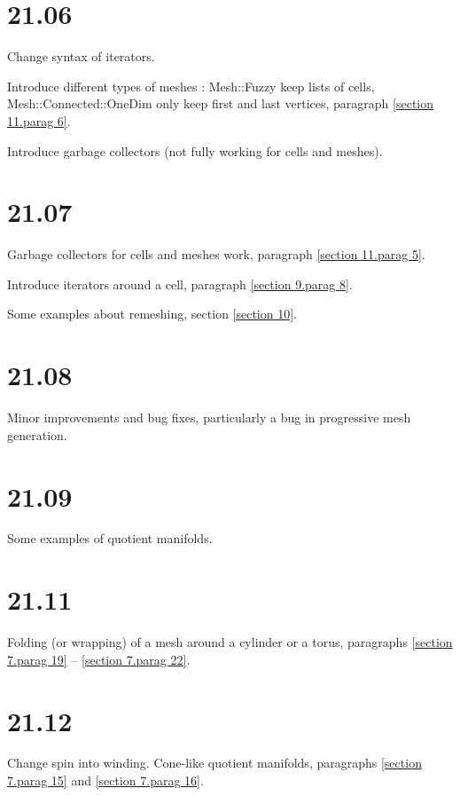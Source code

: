 \documentclass[a4paper]{scrreprt}
\def\numb{}
\newcommand\verm[1]{\textcolor{manif}{#1}}
\renewcommand\tt{\normalfont\ttfamily}
\begin{document}
\section*{21.06}

\noindent Change syntax of iterators.

\noindent Introduce different types of meshes :
{\small\tt\verm{Mesh}::Fuzzy} keep lists of cells,
{\small\tt\verm{Mesh}::Connected::OneDim} only keep first and last vertices,
paragraph \ref{\numb section 11.\numb parag 6}.

\noindent Introduce garbage collectors (not fully working for cells and meshes).


\section*{21.07}

\noindent Garbage collectors for cells and meshes work,
paragraph \ref{\numb section 11.\numb parag 5}.

\noindent Introduce iterators around a cell, paragraph \ref{\numb section 9.\numb parag 8}.

\noindent Some examples about remeshing, section \ref{\numb section 10}.


\section*{21.08}

\noindent Minor improvements and bug fixes, particularly a bug in progressive mesh generation.


\section*{21.09}

\noindent Some examples of quotient manifolds.


\section*{21.11}

\noindent Folding (or wrapping) of a mesh around a cylinder or a torus, paragraphs
\ref{\numb section 7.\numb parag 19} -- \ref{\numb section 7.\numb parag 22}.


\section*{21.12}

\noindent Change {\small\tt spin} into {\small\tt winding}.
Cone-like quotient manifolds, paragraphs \ref{\numb section 7.\numb parag 15} and
\ref{\numb section 7.\numb parag 16}.
\end{document}
